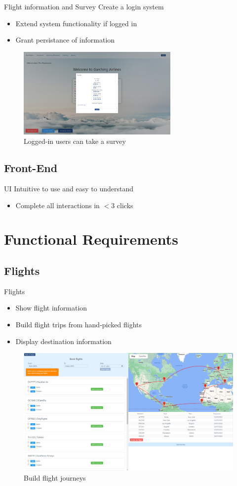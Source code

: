 \documentclass{beamer}
\begin{document}
\begin{frame}{Flight information and Survey}
	Create a login system
	\begin{itemize}
		\item Extend system functionality if logged in
		\item Grant persistance of information
	\end{itemize}
	\begin{figure}
		\includegraphics[width=0.7\textwidth]{../images/survey.png}
		\caption{Logged-in users can take a survey}
	\end{figure}
\end{frame}
%
\subsection{Front-End}
\begin{frame}{UI}
	Intuitive to use and easy to understand
	\begin{itemize}
		\item Complete all interactions in $< 3$ clicks
	\end{itemize}
\end{frame}
%
\section{Functional Requirements}
\subsection{Flights}
\begin{frame}{Flights}
	\begin{itemize}
		\item Show flight information
		\item Build flight trips from hand-picked flights
		\item Display destination information
	\end{itemize}
	\begin{figure}
		\includegraphics[width=.8\textwidth]{../images/BookFlights.png}
		\caption{Build flight journeys}
	\end{figure}
\end{frame}
%
\end{document}
